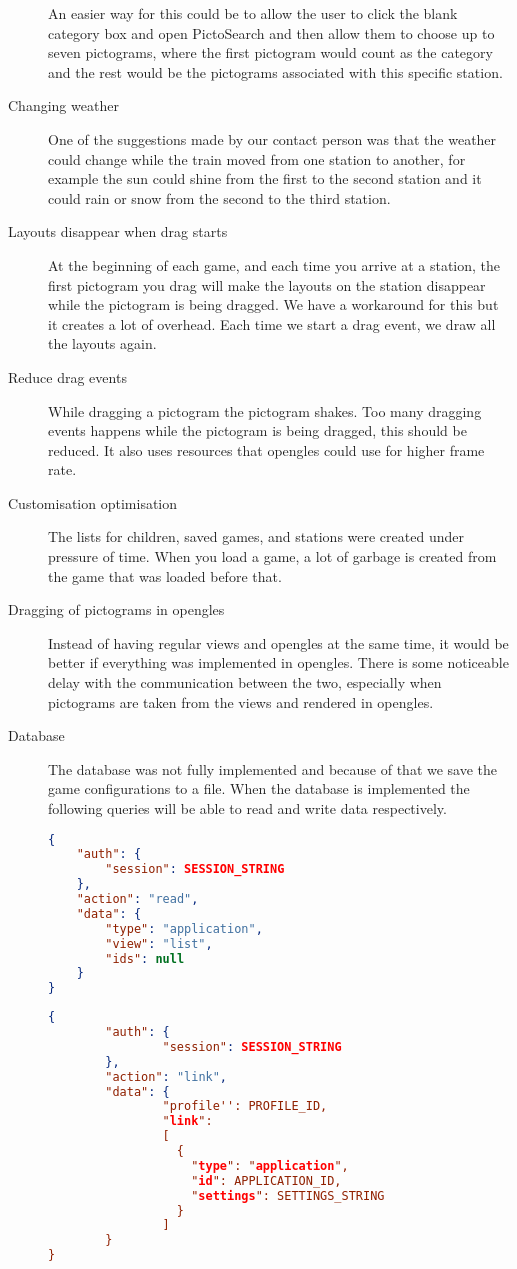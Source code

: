 \begin{description}
An easier way for this could be to allow the user to click the blank category box and open PictoSearch and then allow them to choose up to seven pictograms, where the first pictogram would count as the category and the rest would be the pictograms associated with this specific station.
\item[Changing weather] One of the suggestions made by our contact person was that the weather could change while the train moved from one station to another, for example the sun could shine from the first to the second station and it could rain or snow from the second to the third station. 
\item[Layouts disappear when drag starts] At the beginning of each game, and each time you arrive at a station, the first pictogram you drag will make the layouts on the station disappear while the pictogram is being dragged. We have a workaround for this but it creates a lot of overhead. Each time we start a drag event, we draw all the layouts again.
\item[Reduce drag events] While dragging a pictogram the pictogram shakes. Too many dragging events happens while the pictogram is being dragged, this should be reduced. It also uses resources that \ac{opengles} could use for higher frame rate.
\item[Customisation optimisation] The lists for children, saved games, and stations were created under pressure of time. When you load a game, a lot of garbage is created from the game that was loaded before that.
\item[Dragging of pictograms in \ac{opengles}] Instead of having regular views and \ac{opengles} at the same time, it would be better if everything was implemented in \ac{opengles}. There is some noticeable delay with the communication between the two, especially when pictograms are taken from the views and rendered in \ac{opengles}.
\item[Database] The database was not fully implemented and because of that we save the game configurations to a file. When the database is implemented the following queries will be able to read and write data respectively.
\begin{lstlisting}[language=json,firstnumber=1,caption={JSON query to read application data},label=lst:jsonread]
{
	"auth": {
		"session": SESSION_STRING
	},
	"action": "read",
	"data": {
		"type": "application",
		"view": "list",
		"ids": null
	}
}
\end{lstlisting}

\begin{lstlisting}[language=json,firstnumber=1,caption={JSON query to write application data},label=lst:jsonwrite]
{
        "auth": {
                "session": SESSION_STRING
        },
        "action": "link",
        "data": {
                "profile'': PROFILE_ID,
                "link":
                [
                  {
                    "type": "application",
                    "id": APPLICATION_ID,
                    "settings": SETTINGS_STRING
                  }
                ]
        }
}
\end{lstlisting}
\end{description}
